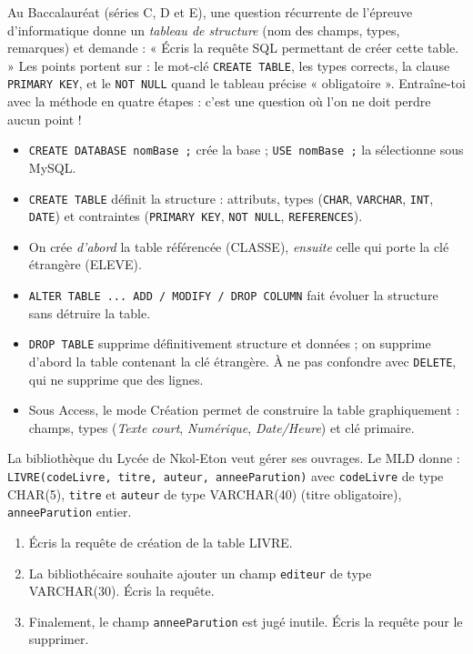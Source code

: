 \documentclass[11pt]{article}
\newcommand{\cle}[1]{{\popxbold\color{popdark}#1}}
\begin{document}
\begin{savaistu}
Au Baccalauréat (séries C, D et E), une question récurrente de l'épreuve d'informatique donne un \emph{tableau de structure} (nom des champs, types, remarques) et demande : « Écris la requête SQL permettant de créer cette table. » Les points portent sur : le mot-clé \texttt{CREATE TABLE}, les types corrects, la clause \texttt{PRIMARY KEY}, et le \texttt{NOT NULL} quand le tableau précise « obligatoire ». Entraîne-toi avec la méthode en quatre étapes : c'est une question où l'on ne doit perdre aucun point !
\end{savaistu}

\begin{aretenir}
\begin{itemize}
\item \texttt{CREATE DATABASE nomBase ;} crée la base ; \texttt{USE nomBase ;} la sélectionne sous MySQL.
\item \texttt{CREATE TABLE} définit la structure : attributs, types (\texttt{CHAR}, \texttt{VARCHAR}, \texttt{INT}, \texttt{DATE}) et contraintes (\texttt{PRIMARY KEY}, \texttt{NOT NULL}, \texttt{REFERENCES}).
\item On crée \emph{d'abord} la table référencée (CLASSE), \emph{ensuite} celle qui porte la clé étrangère (ELEVE).
\item \texttt{ALTER TABLE ... ADD / MODIFY / DROP COLUMN} fait évoluer la structure sans détruire la table.
\item \texttt{DROP TABLE} supprime définitivement structure et données ; on supprime d'abord la table contenant la clé étrangère. À ne pas confondre avec \texttt{DELETE}, qui ne supprime que des lignes.
\item Sous Access, le mode Création permet de construire la table graphiquement : champs, types (\emph{Texte court}, \emph{Numérique}, \emph{Date/Heure}) et clé primaire.
\end{itemize}
\end{aretenir}

\begin{exercice}
La bibliothèque du Lycée de Nkol-Eton veut gérer ses ouvrages. Le MLD donne : \texttt{LIVRE(\cle{codeLivre}, titre, auteur, anneeParution)} avec \texttt{codeLivre} de type CHAR(5), \texttt{titre} et \texttt{auteur} de type VARCHAR(40) (titre obligatoire), \texttt{anneeParution} entier.
\begin{enumerate}
\item Écris la requête de création de la table LIVRE.
\item La bibliothécaire souhaite ajouter un champ \texttt{editeur} de type VARCHAR(30). Écris la requête.
\item Finalement, le champ \texttt{anneeParution} est jugé inutile. Écris la requête pour le supprimer.
\end{enumerate}
\end{exercice}
\end{document}
